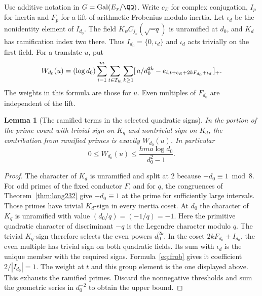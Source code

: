 \documentclass[a4paper,11pt]{article}
\newtheorem{lemma}[proposition]{Lemma}
\theoremstyle{definition}
\theoremstyle{remark}
\numberwithin{equation}{section}
\begin{document}
Use additive notation in \(G=\operatorname{Gal}(E_x/\QQ)\).
Write \(c_E\) for complex conjugation, \(I_p\) for inertia and
\(F_p\) for a lift of arithmetic Frobenius modulo inertia.
Let \(\iota_d\) be the nonidentity element of \(I_{d_0}\).
The field \(K_\psi C_{j_x}(\sqrt{-q})\) is unramified at \(d_0\),
and \(K_d\) has ramification index two there. Thus
\(I_{d_0}=\{0,\iota_d\}\) and \(\iota_d\) acts trivially on the
first field. For a translate \(u\), put
\[
 W_{d_0}(u)=(\log d_0)\sum_{i=1}^m\sum_{t\in T_{\rm hi}}
       \sum_{k\ge1}
       [\,a/d_0^{2k}-e_{i,t+c_E+2kF_{d_0}+\iota_d}\,]_+ .
\]
The weights in this formula are those for \(u\). Even multiples
of \(F_{d_0}\) are independent of the lift.

\begin{lemma}[The ramified terms in the selected quadratic signs]\leavevmode
\label{lem:ramcenter460}
In the portion of the prime count with trivial sign on \(K_q\)
and nontrivial sign on \(K_d\), the contribution from ramified
primes is exactly \(W_{d_0}(u)\). In particular
\[
           0\le W_{d_0}(u)
              \le \frac{hma\log d_0}{d_0^2-1}.
\]
\end{lemma}
\begin{proof}
The character of \(K_d\) is unramified and split at \(2\) because
\(-d_0\equiv1\bmod8\). For odd primes of the fixed conductor
\(F\), and for \(q\), the congruences of
Theorem~\ref{thm:long232} give \(-d_0\equiv1\) at the prime
for sufficiently large intervals. Those primes have trivial
\(K_d\)-sign in every inertia coset. At \(d_0\) the character
of \(K_q\) is unramified with value
\((d_0/q)=(-1/q)=-1\). Here the primitive quadratic character
of discriminant \(-q\) is the Legendre character modulo \(q\).
The trivial \(K_q\)-sign therefore selects the even powers
\(d_0^{2k}\). In the coset \(2kF_{d_0}+I_{d_0}\), the even
multiple has trivial sign on both quadratic fields. Its sum
with \(\iota_d\) is the unique member with the required signs.
Formula~\eqref{eq:frob} gives it coefficient
\(2/|I_{d_0}|=1\). The weight at \(t\) and this group element
is the one displayed above. This exhausts the ramified primes.
Discard the nonnegative thresholds and sum the geometric series
in \(d_0^{-2}\) to obtain the upper bound.
\end{proof}
\end{document}

